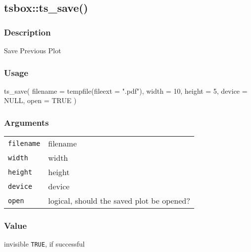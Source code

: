 \documentclass[
  letterpaper,
  DIV=11,
  numbers=noendperiod]{scrreport}
\newenvironment{Shaded}{\begin{snugshade}}{\end{snugshade}}
\newcommand{\AttributeTok}[1]{\textcolor[rgb]{0.40,0.45,0.13}{#1}}
\newcommand{\ConstantTok}[1]{\textcolor[rgb]{0.56,0.35,0.01}{#1}}
\newcommand{\DecValTok}[1]{\textcolor[rgb]{0.68,0.00,0.00}{#1}}
\newcommand{\FunctionTok}[1]{\textcolor[rgb]{0.28,0.35,0.67}{#1}}
\newcommand{\NormalTok}[1]{\textcolor[rgb]{0.00,0.23,0.31}{#1}}
\newcommand{\StringTok}[1]{\textcolor[rgb]{0.13,0.47,0.30}{#1}}
\begin{document}
\subsection{tsbox::ts\_save()}\label{tsboxts_save}

\subsubsection{Description}\label{description-62}

Save Previous Plot

\subsubsection{Usage}\label{usage-62}

\begin{Shaded}
\begin{Highlighting}[]
\FunctionTok{ts\_save}\NormalTok{(}
  \AttributeTok{filename =} \FunctionTok{tempfile}\NormalTok{(}\AttributeTok{fileext =} \StringTok{".pdf"}\NormalTok{),}
  \AttributeTok{width =} \DecValTok{10}\NormalTok{,}
  \AttributeTok{height =} \DecValTok{5}\NormalTok{,}
  \AttributeTok{device =} \ConstantTok{NULL}\NormalTok{,}
  \AttributeTok{open =} \ConstantTok{TRUE}
\NormalTok{)}
\end{Highlighting}
\end{Shaded}

\subsubsection{Arguments}\label{arguments-62}

\begin{longtable}[]{@{}ll@{}}
\toprule\noalign{}
\endhead
\bottomrule\noalign{}
\endlastfoot
\texttt{filename} & filename \\
\texttt{width} & width \\
\texttt{height} & height \\
\texttt{device} & device \\
\texttt{open} & logical, should the saved plot be opened? \\
\end{longtable}

\subsubsection{Value}\label{value-60}

invisible \texttt{TRUE}, if successful
\end{document}
